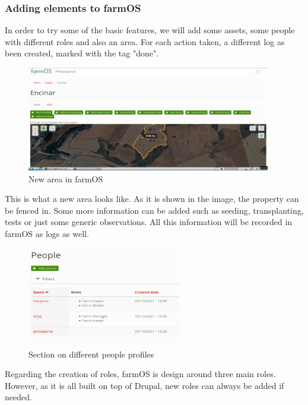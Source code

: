 \subsubsection*{Adding elements to farmOS}
In order to try some of the basic features, we will add some assets, some people with different roles and also an area.
For each action taken, a different log as been created, marked with the tag "done".

\begin{figure}[htp]
    \centering
    \includegraphics[width=0.95\textwidth]{fig/area.png}
    \caption{New area in farmOS}
    \label{fig:area}
\end{figure}

This is what a new area looks like. As it is shown in the image, the property can be fenced in. Some more information can be added such as seeding, transplanting, tests or just some generic observations. All this information will be recorded in farmOS as logs as well.

\begin{figure}[htp]
    \centering
    \includegraphics[width=0.6\textwidth]{fig/people.png}
    \caption{Section on different people profiles}
    \label{fig:people}
\end{figure}

Regarding the creation of roles, farmOS is design around three main roles. However, as it is all built on top of Drupal, new roles can always be added if needed.

